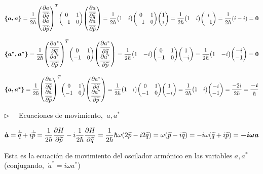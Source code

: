 \begin{small}
$\boldsymbol{\{a,a\}}=\dfrac 1{2\hbar} \mqty( \displaystyle \pdv{a}{\widetilde q} \\\displaystyle \pdv{a}{\widetilde p})^T \mqty(0&1\\-1&0) \mqty( \displaystyle \pdv{a}{\widetilde q} \\\displaystyle \pdv{a}{\widetilde p})= \dfrac 1{2\hbar} \mqty(1&i) \mqty(0&1\\-1&0)\mqty(1 \\ i)=\dfrac 1{2\hbar} \mqty(1&i)\mqty(i\\-1)=\dfrac 1{2\hbar}(i-i)=\boldsymbol{0}$ 


$\boldsymbol{\{a^*,a^*\}}=\dfrac 1{2\hbar} \mqty( \displaystyle \pdv{a^*}{\widetilde q} \\\displaystyle \pdv{a^*}{\widetilde p})^T \mqty(0&1\\-1&0) \mqty( \displaystyle \pdv{a^*}{\widetilde q} \\\displaystyle \pdv{a^*}{\widetilde p})= \dfrac 1{2\hbar} \mqty(1&-i) \mqty(0&1\\-1&0)\mqty(1 \\ -i)=\dfrac 1{2\hbar} \mqty(1&-i)\mqty(-i\\-1)=\boldsymbol{0} $

$\boldsymbol{\{a,a^*\}}=\dfrac 1{2\hbar} \mqty( \displaystyle \pdv{a}{\widetilde q} \\\displaystyle \pdv{a}{\widetilde p})^T \mqty(0&1\\-1&0) \mqty( \displaystyle \pdv{a^*}{\widetilde q} \\\displaystyle \pdv{a^*}{\widetilde p})= \dfrac 1{2\hbar} \mqty(1&i) \mqty(0&1\\-1&0)\mqty(1 \\ -i)=\dfrac 1{2\hbar} \mqty(1&i)\mqty(-i\\-1)=\dfrac {-2i}{2\hbar}= \boldsymbol{\dfrac{-i}{\hbar}}$ 

\vspace{5mm} $\triangleright\quad$ Ecuaciones de movimiento, $ \ a,a^*$

$\boldsymbol{ \dot a}=\dot{\widetilde q} + i \dot{\widetilde p} =\displaystyle \dfrac{1}{2\hbar} \pdv{H}{\widetilde p} -i \dfrac{1}{2\hbar} \pdv{H}{\widetilde q}=\dfrac{1}{2\hbar} \hbar \omega (2\widetilde p - i 2 \widetilde q)=\omega (\widetilde p - i\widetilde q)=-i\omega(\widetilde q + i\widetilde p)=\boldsymbol{-i\omega a}$
\end{small}

Esta es la ecuación de movimiento del oscilador armónico en las variables $a , a^* $ \textcolor{gris}{(conjugando, $\ \dot  a^*=i\omega a^*$)}

